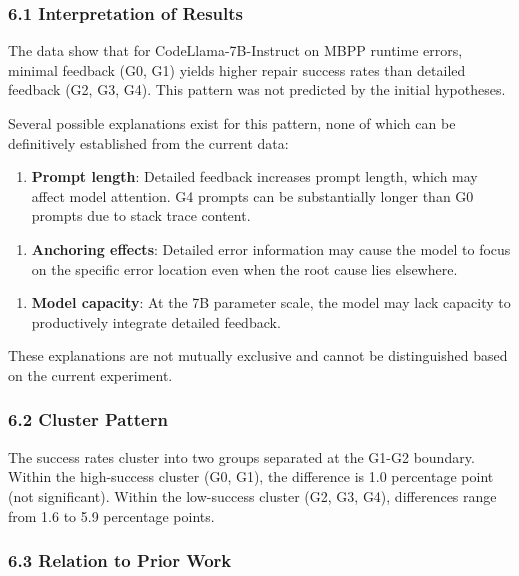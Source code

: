 
\subsubsection{6.1 Interpretation of Results}

The data show that for CodeLlama-7B-Instruct on MBPP runtime errors, minimal feedback (G0, G1) yields higher repair success rates than detailed feedback (G2, G3, G4). This pattern was not predicted by the initial hypotheses.

Several possible explanations exist for this pattern, none of which can be definitively established from the current data:

\begin{enumerate}
\item \textbf{Prompt length}: Detailed feedback increases prompt length, which may affect model attention. G4 prompts can be substantially longer than G0 prompts due to stack trace content.
\end{enumerate}

\begin{enumerate}
\item \textbf{Anchoring effects}: Detailed error information may cause the model to focus on the specific error location even when the root cause lies elsewhere.
\end{enumerate}

\begin{enumerate}
\item \textbf{Model capacity}: At the 7B parameter scale, the model may lack capacity to productively integrate detailed feedback.
\end{enumerate}

These explanations are not mutually exclusive and cannot be distinguished based on the current experiment.

\subsubsection{6.2 Cluster Pattern}

The success rates cluster into two groups separated at the G1-G2 boundary. Within the high-success cluster (G0, G1), the difference is 1.0 percentage point (not significant). Within the low-success cluster (G2, G3, G4), differences range from 1.6 to 5.9 percentage points.

\subsubsection{6.3 Relation to Prior Work}

